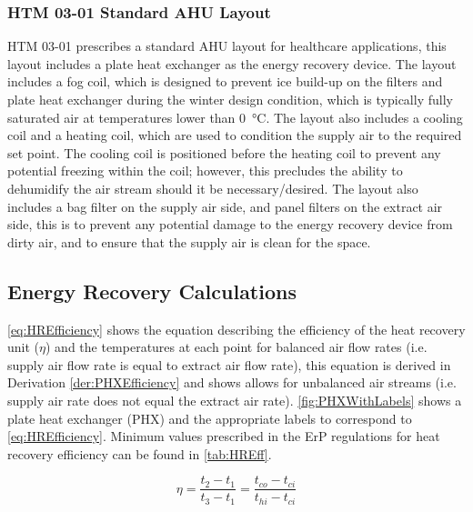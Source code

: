 \subsubsection{\gls{HTM} 03-01 Standard AHU Layout}

\gls{HTM} 03-01 prescribes a standard AHU layout for healthcare applications, this layout includes a plate heat exchanger as the energy recovery device.  The layout includes a fog coil, which is designed to prevent ice build-up on the filters and plate heat exchanger during the winter design condition, which is typically fully saturated air at temperatures lower than \SI{0}{\celsius}.  The layout also includes a cooling coil and a heating coil, which are used to condition the supply air to the required set point.  The cooling coil is positioned before the heating coil to prevent any potential freezing within the coil; however, this precludes the ability to dehumidify the air stream should it be necessary/desired.  The layout also includes a bag filter on the supply air side, and panel filters on the extract air side, this is to prevent any potential damage to the energy recovery device from dirty air, and to ensure that the supply air is clean for the space.


\subsection{Energy Recovery Calculations}
\label{ssec:Vent_HeatRecoveryCalculations}

\autoref{eq:HREfficiency} shows the equation describing the efficiency of the heat recovery unit ($\eta$) and the temperatures at each point for balanced air flow rates (i.e. supply air flow rate is equal to extract air flow rate), this equation is derived in Derivation \ref{der:PHXEfficiency} and shows allows for unbalanced air streams (i.e. supply air rate does not equal the extract air rate).  \autoref{fig:PHXWithLabels} shows a plate heat exchanger (PHX) and the appropriate labels to correspond to \autoref{eq:HREfficiency}.  Minimum values prescribed in the ErP regulations for heat recovery efficiency can be found in \autoref{tab:HREff}.

\begin{equation}\label{eq:HREfficiency}
\eta = \frac{t_2 - t_1}{t_3 - t_1} = \frac{t_{co} - t_{ci}}{t_{hi} - t_{ci}}
\end{equation}


